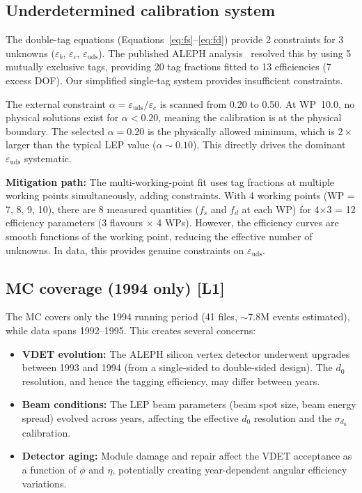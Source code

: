 \documentclass[11pt,a4paper]{article}
\begin{document}
\subsection{Underdetermined calibration system}

The double-tag equations (Equations~\ref{eq:fs}--\ref{eq:fd}) provide 2 constraints
for 3 unknowns ($\varepsilon_b$, $\varepsilon_c$, $\varepsilon_\mathrm{uds}$). The
published ALEPH analysis~\cite{ALEPH:Rb:1996} resolved this by using 5 mutually
exclusive tags, providing 20 tag fractions fitted to 13 efficiencies (7 excess DOF).
Our simplified single-tag system provides insufficient constraints.

The external constraint $\alpha = \varepsilon_\mathrm{uds} / \varepsilon_c$ is scanned
from 0.20 to 0.50. At WP~10.0, no physical solutions exist for $\alpha < 0.20$,
meaning the calibration is at the physical boundary. The selected $\alpha = 0.20$ is
the physically allowed minimum, which is $2\times$ larger than the typical LEP value
($\alpha \sim 0.10$). This directly drives the dominant $\varepsilon_\mathrm{uds}$
systematic.

\textbf{Mitigation path:} The multi-working-point fit uses tag fractions at multiple
working points simultaneously, adding constraints. With 4 working points (WP = 7, 8, 9, 10),
there are 8 measured quantities ($f_s$ and $f_d$ at each WP) for 4$\times$3 = 12
efficiency parameters (3 flavours $\times$ 4 WPs). However, the efficiency curves
are smooth functions of the working point, reducing the effective number of unknowns.
In data, this provides genuine constraints on $\varepsilon_\mathrm{uds}$.

\subsection{MC coverage (1994 only) [L1]}

The MC covers only the 1994 running period (41 files, $\sim 7.8$M events estimated),
while data spans 1992--1995. This creates several concerns:

\begin{itemize}
\item \textbf{VDET evolution:} The ALEPH silicon vertex detector underwent upgrades
between 1993 and 1994 (from a single-sided to double-sided design). The $d_0$
resolution, and hence the tagging efficiency, may differ between years.

\item \textbf{Beam conditions:} The LEP beam parameters (beam spot size, beam energy
spread) evolved across years, affecting the effective $d_0$ resolution and the
$\sigma_{d_0}$ calibration.

\item \textbf{Detector aging:} Module damage and repair affect the VDET acceptance
as a function of $\phi$ and $\eta$, potentially creating year-dependent angular
efficiency variations.
\end{itemize}
\end{document}
